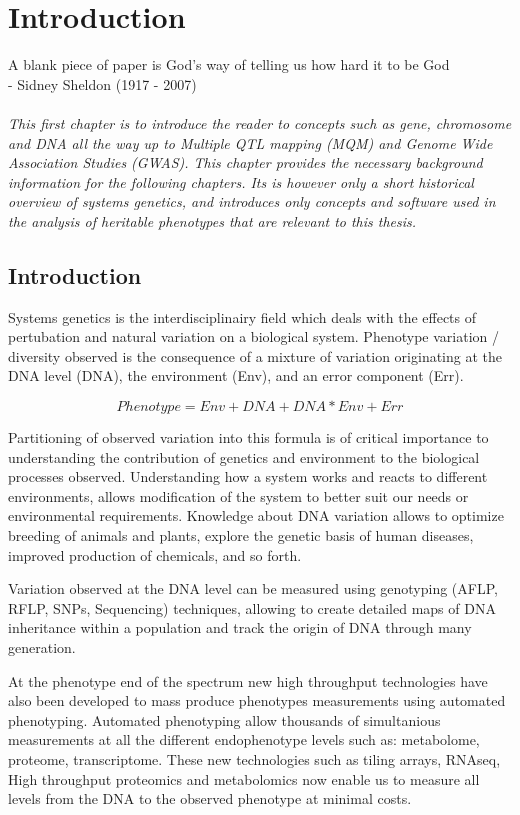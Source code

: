 \chapter{Introduction}
\label{chap:introduction}
A blank piece of paper is God's way of telling us how hard it to be God\\
- Sidney Sheldon (1917 - 2007)\\\\

\emph{This first chapter is to introduce the reader to concepts such as gene, chromosome 
and DNA all the way up to Multiple QTL mapping (MQM) and Genome Wide Association Studies 
(GWAS). This chapter provides the necessary background information for the following 
chapters. Its is however only a short historical overview of systems genetics, and 
introduces only concepts and software used in the analysis of heritable phenotypes that 
are relevant to this thesis. }

\null
\vfill
\newpage

\section{Introduction}
Systems genetics is the interdisciplinairy field which deals with the effects of 
pertubation and natural variation on a biological system. Phenotype variation / 
diversity observed is the consequence of a mixture of variation originating at the 
DNA level (DNA), the environment (Env), and an error component (Err).

$$ Phenotype = Env + DNA + DNA * Env + Err $$

Partitioning of observed variation into this formula is of critical importance 
to understanding the contribution of genetics and environment to the biological 
processes observed. Understanding how a system works and reacts to different 
environments, allows modification of the system to better suit our needs or 
environmental requirements. Knowledge about DNA variation allows to optimize 
breeding of animals and plants, explore the genetic basis of human diseases, 
improved production of chemicals, and so forth.

Variation observed at the DNA level can be measured using genotyping (AFLP, RFLP, 
SNPs, Sequencing) techniques, allowing to create detailed maps of DNA inheritance 
within a population and track the origin of DNA through many generation.

At the phenotype end of the spectrum new high throughput technologies have also 
been developed to mass produce phenotypes measurements using automated phenotyping. 
Automated phenotyping allow thousands of simultanious measurements at all the 
different endophenotype levels such as: metabolome, proteome, transcriptome. These 
new technologies such as tiling arrays, RNAseq, High throughput proteomics and 
metabolomics now enable us to measure all levels from the DNA to the observed 
phenotype at minimal costs.

